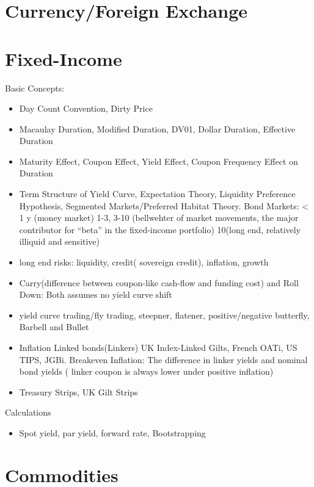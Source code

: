 \documentclass[11pt, openany]{book}              %
\begin{document}
\section{Currency/Foreign Exchange}
\section{Fixed-Income}
Basic Concepts:
\begin{itemize}
    \item Day Count Convention, Dirty Price
    \item Macaulay Duration, Modified Duration, DV01, Dollar Duration, Effective Duration
    \item Maturity Effect, Coupon Effect, Yield Effect, Coupon Frequency Effect on Duration
    \item Term Structure of Yield Curve, Expectation Theory, Liquidity Preference Hypothesis, Segmented Markets/Preferred Habitat Theory. Bond Markets: < 1 y (money market) 1-3, 3-10 (bellwehter of market movements, the major contributor for “beta” in the fixed-income portfolio) 10(long end, relatively illiquid and sensitive) 
    \item long end risks: liquidity, credit( sovereign credit), inflation, growth
    \item Carry(difference between coupon-like cash-flow and funding cost) and Roll Down: Both assumes no yield curve shift
    \item yield curve trading/fly trading, steepner, flatener, positive/negative butterfly, Barbell and Bullet
    \item Inflation Linked bonds(Linkers) UK Index-Linked Gilts, French OATi, US TIPS, JGBi. Breakeven Inflation: The difference in linker yields and nominal bond yields ( linker coupon is always lower under positive inflation) 
    \item Treasury Strips, UK Gilt Strips 
\end{itemize}

Calculations
\begin{itemize}
    \item Spot yield, par yield, forward rate, Bootstrapping
\end{itemize}

\section{Commodities}
\end{document}

